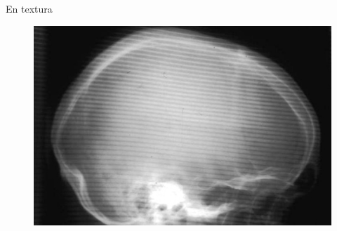 \documentclass[table]{beamer}
\begin{document}
\begin{frame}[fragile]{En textura}
    \begin{figure}
        \includegraphics[width=.8\linewidth]{./figures/skull.jpg}
    \end{figure}
\end{frame}
\end{document}
